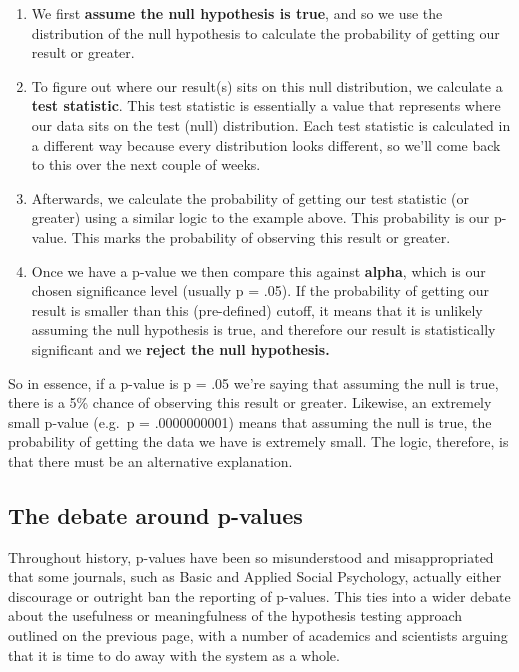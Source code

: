 \documentclass[
]{book}
\providecommand{\tightlist}{%
  \setlength{\itemsep}{0pt}\setlength{\parskip}{0pt}}
\begin{document}
\begin{enumerate}
\def\labelenumi{\arabic{enumi}.}
\tightlist
\item
  We first \textbf{assume the null hypothesis is true}, and so we use the distribution of the null hypothesis to calculate the probability of getting our result or greater.
\item
  To figure out where our result(s) sits on this null distribution, we calculate a \textbf{test statistic}. This test statistic is essentially a value that represents where our data sits on the test (null) distribution. Each test statistic is calculated in a different way because every distribution looks different, so we'll come back to this over the next couple of weeks.
\item
  Afterwards, we calculate the probability of getting our test statistic (or greater) using a similar logic to the example above. This probability is our p-value. This marks the probability of observing this result or greater.
\item
  Once we have a p-value we then compare this against \textbf{alpha}, which is our chosen significance level (usually p = .05). If the probability of getting our result is smaller than this (pre-defined) cutoff, it means that it is unlikely assuming the null hypothesis is true, and therefore our result is statistically significant and we \textbf{reject the null hypothesis. }
\end{enumerate}

So in essence, if a p-value is p = .05 we're saying that assuming the null is true, there is a 5\% chance of observing this result or greater. Likewise, an extremely small p-value (e.g.~p = .0000000001) means that assuming the null is true, the probability of getting the data we have is extremely small. The logic, therefore, is that there must be an alternative explanation.

\hypertarget{the-debate-around-p-values}{%
\subsection{The debate around p-values}\label{the-debate-around-p-values}}

Throughout history, p-values have been so misunderstood and misappropriated that some journals, such as Basic and Applied Social Psychology, actually either discourage or outright ban the reporting of p-values. This ties into a wider debate about the usefulness or meaningfulness of the hypothesis testing approach outlined on the previous page, with a number of academics and scientists arguing that it is time to do away with the system as a whole.
\end{document}
